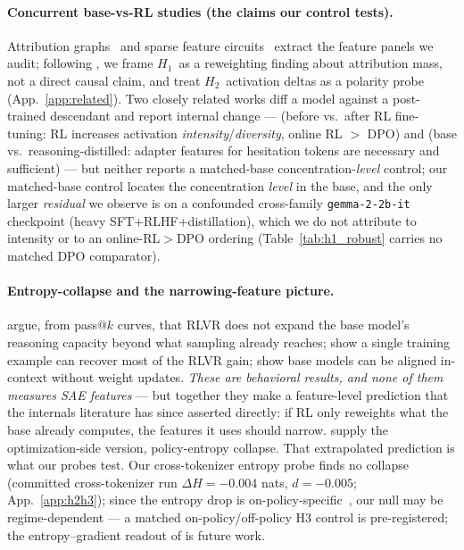 \documentclass{article}
\newcommand{\Hone}{\ensuremath{H_{1}}}
\newcommand{\Htwo}{\ensuremath{H_{2}}}
\begin{document}
\paragraph{Concurrent base-vs-RL studies (the claims our control tests).} Attribution graphs~\citep{ameisen2025circuit,lindsey2025biology,heimersheim2024patching,vig2020causal} and sparse feature circuits~\citep{marks2024sparse_circuits} extract the feature panels we audit; following \citet{five_stage_causal_sae2026}, we frame \Hone\ as a reweighting finding about attribution mass, not a direct causal claim, and treat \Htwo\ activation deltas as a polarity probe (App.~\ref{app:related}). Two closely related works diff a model against a post-trained descendant and report internal change --- \citet{rl_circuit_intensity2026} (before vs.\ after RL fine-tuning: RL increases activation \emph{intensity}/\emph{diversity}, online RL $>$ DPO) and \citet{transcoder_diffing2026} (base vs.\ reasoning-distilled: adapter features for hesitation tokens are necessary and sufficient) --- but neither reports a matched-base concentration-\emph{level} control; our matched-base control locates the concentration \emph{level} in the base, and the only larger \emph{residual} we observe is on a confounded cross-family \texttt{gemma-2-2b-it} checkpoint (heavy SFT+RLHF+distillation), which we do not attribute to intensity or to an online-RL$>$DPO ordering (Table~\ref{tab:h1_robust} carries no matched DPO comparator).

\paragraph{Entropy-collapse and the narrowing-feature picture.} \citet{yue2025} argue, from pass@$k$ curves, that RLVR does not expand the base model's reasoning capacity beyond what sampling already reaches; \citet{wang2025} show a single training example can recover most of the RLVR gain; \citet{lin2024} show base models can be aligned in-context without weight updates. \emph{These are behavioral results, and none of them measures SAE features} --- but together they make a feature-level prediction that the internals literature has since asserted directly: if RL only reweights what the base already computes, the features it uses should narrow. \citet{cui2025entropy_mechanism} supply the optimization-side version, policy-entropy collapse. That extrapolated prediction is what our probes test. Our cross-tokenizer entropy probe finds no collapse (committed cross-tokenizer run $\Delta H=-0.004$ nats, $d=-0.005$; App.~\ref{app:h2h3}); since the entropy drop is on-policy-specific~\citep{enaction2026}, our null may be regime-dependent --- a matched on-policy/off-policy H3 control is pre-registered; the entropy--gradient readout of \citet{entropy_gradient_inversion2026} is future work.
\end{document}
